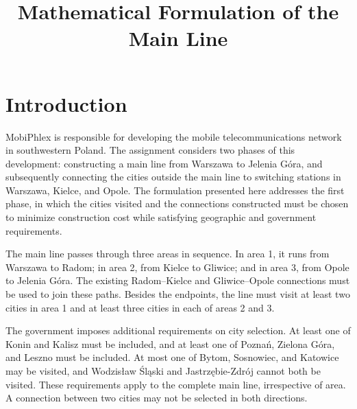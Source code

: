 \documentclass[11pt,a4paper]{article}
\title{Mathematical Formulation of the Main Line}
\author{}
\date{}
\begin{document}
\maketitle

\section{Introduction}
\label{sec:A}
MobiPhlex is responsible for developing the mobile telecommunications network in southwestern Poland. The assignment considers two phases of this development: constructing a main line from Warszawa to Jelenia Góra, and subsequently connecting the cities outside the main line to switching stations in Warszawa, Kielce, and Opole. The formulation presented here addresses the first phase, in which the cities visited and the connections constructed must be chosen to minimize construction cost while satisfying geographic and government requirements.

The main line passes through three areas in sequence. In area 1, it runs from Warszawa to Radom; in area 2, from Kielce to Gliwice; and in area 3, from Opole to Jelenia Góra. The existing Radom--Kielce and Gliwice--Opole connections must be used to join these paths. Besides the endpoints, the line must visit at least two cities in area 1 and at least three cities in each of areas 2 and 3.

The government imposes additional requirements on city selection. At least one of Konin and Kalisz must be included, and at least one of Poznań, Zielona Góra, and Leszno must be included. At most one of Bytom, Sosnowiec, and Katowice may be visited, and Wodzisław Śląski and Jastrzębie-Zdrój cannot both be visited. These requirements apply to the complete main line, irrespective of area. A connection between two cities may not be selected in both directions.
\end{document}
